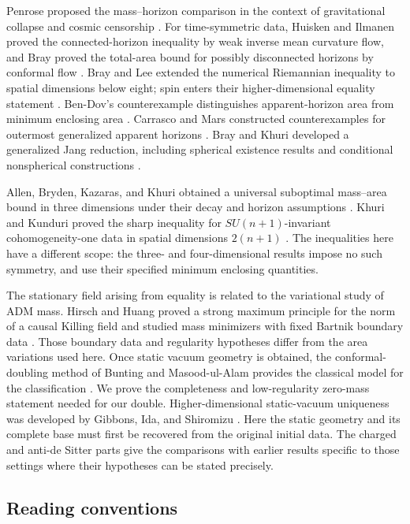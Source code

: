 Penrose proposed the mass--horizon comparison in the context of
gravitational collapse and cosmic censorship \cite{Penrose1973}.
For time-symmetric data, Huisken and Ilmanen proved the
connected-horizon inequality by weak inverse mean curvature flow,
and Bray proved the total-area bound for possibly disconnected
horizons by conformal flow \cite{HuiskenIlmanen2001,Bray2001}.
Bray and Lee extended the numerical Riemannian inequality to spatial
dimensions below eight; spin enters their higher-dimensional equality
statement \cite{BrayLee2009}. Ben-Dov's counterexample distinguishes
apparent-horizon area from minimum enclosing area \cite{BenDov2004}.
Carrasco and Mars constructed counterexamples for outermost generalized
apparent horizons \cite{CarrascoMars2010}.
Bray and Khuri developed a generalized Jang reduction, including
spherical existence results and conditional nonspherical constructions
\cite{BrayKhuri2010,BrayKhuri2011}.

Allen, Bryden, Kazaras, and Khuri obtained a universal suboptimal
mass--area bound in three dimensions under their decay and horizon
assumptions \cite{AllenBrydenKazarasKhuri2025}.
Khuri and Kunduri proved the sharp inequality for
$SU(n+1)$-invariant cohomogeneity-one data in spatial dimensions
$2(n+1)$ \cite{KhuriKunduri2025}.
The inequalities here have a different scope: the three- and
four-dimensional results impose no such symmetry, and use their
specified minimum enclosing quantities.

The stationary field arising from equality is related to the
variational study of ADM mass. Hirsch and Huang proved a strong
maximum principle for the norm of a causal Killing field and studied
mass minimizers with fixed Bartnik boundary data
\cite{HirschHuang2025}. Those boundary data and regularity hypotheses
differ from the area variations used here. Once static vacuum geometry
is obtained, the conformal-doubling method of Bunting and
Masood-ul-Alam provides the classical model for the classification
\cite{BuntingMasoodUlAlam1987}. We prove the completeness and
low-regularity zero-mass statement needed for our double.
Higher-dimensional static-vacuum uniqueness was developed by Gibbons,
Ida, and Shiromizu \cite{GibbonsIdaShiromizu2002}. Here the static geometry
and its complete base must first be recovered from the original initial data.
The charged and anti-de Sitter parts give the comparisons with
earlier results specific to those settings where their hypotheses
can be stated precisely.

\subsection{Reading conventions}

